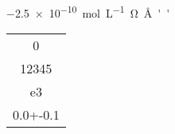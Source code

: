 \documentclass{article}
\begin{document}
\SI{-2.5e-10}{mol.L^{-1}.\ohm.\angstrom''}


\vrule
\begin{tabular}{S}
  0 \\   12345 \\   e3 \\   0.0+-0.1
\end{tabular}
\vrule
\end{document}
